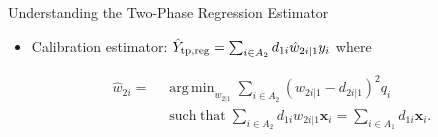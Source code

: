 \documentclass{beamer} %
\DeclareMathOperator*{\argmin}{arg\,min}
\DeclareMathOperator*{\suchthat}{such\; that}
\renewcommand{\bf}[1]{\mathbf{#1}}
\begin{document}
%
%
%
%
%
%
%
%
%
%
%

\begin{frame}{Understanding the Two-Phase Regression Estimator}

  \begin{itemize}
    \item Calibration estimator: $\hat Y_{\rm{tp, reg}} = \sum_{i \in A_2} 
      d_{1i}\hat w_{2i|1} y_i$ where 

  \begin{align*}
    \hat w_{2i} 
    =& \; \argmin_{w_{2|1}} \sum_{i \in A_2} (w_{2i|1} - d_{2i|1})^2 q_i\\
     &\; \suchthat \sum_{i \in A_2} d_{1i} w_{2i|1} \bf x_i 
     = \sum_{i \in A_1} d_{1i} \bf x_i. 
  \end{align*}
  \end{itemize}

\end{frame}
\end{document}
